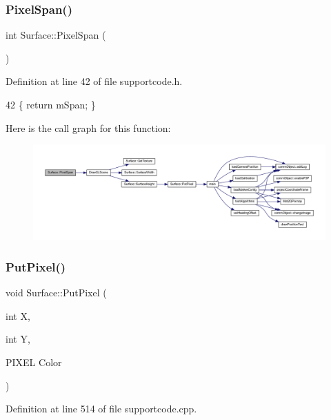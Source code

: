 \subsubsection{\texorpdfstring{Pixel\+Span()}{PixelSpan()}}
{\footnotesize\ttfamily int Surface\+::\+Pixel\+Span (\begin{DoxyParamCaption}{ }\end{DoxyParamCaption})\hspace{0.3cm}{\ttfamily [inline]}}



Definition at line 42 of file supportcode.\+h.


\begin{DoxyCode}
42 \{ \textcolor{keywordflow}{return} mSpan; \}
\end{DoxyCode}
Here is the call graph for this function\+:
\nopagebreak
\begin{figure}[H]
\begin{center}
\leavevmode
\includegraphics[width=350pt]{class_surface_abe0d542404575c60911d6ad4219560f9_cgraph}
\end{center}
\end{figure}
\mbox{\label{class_surface_a728571d0386e9690ce1760931562c72b}} 
\subsubsection{\texorpdfstring{Put\+Pixel()}{PutPixel()}}
{\footnotesize\ttfamily void Surface\+::\+Put\+Pixel (\begin{DoxyParamCaption}\item[{int}]{X,  }\item[{int}]{Y,  }\item[{P\+I\+X\+EL}]{Color }\end{DoxyParamCaption})}



Definition at line 514 of file supportcode.\+cpp.


